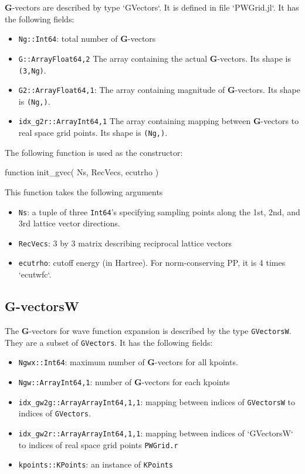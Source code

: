 \documentclass[a4paper,10pt]{paper}
\newcommand{\jlcode}[1]{\texttt{#1}}
\begin{document}
$\mathbf{G}$-vectors are described by type `GVectors`. It is defined in file `PWGrid.jl`.
It has the following fields:
\begin{itemize}
%
\item \jlcode{Ng::Int64}: total number of $\mathbf{G}$-vectors
%
\item \jlcode{G::Array{Float64,2}} The array containing the actual $\mathbf{G}$-vectors.
   Its shape is \jlcode{(3,Ng)}.
%
\item \jlcode{G2::Array{Float64,1}}: The array containing magnitude of $\mathbf{G}$-vectors.
  Its shape is \jlcode{(Ng,)}.
%
\item \jlcode{idx_g2r::Array{Int64,1}} The array containing mapping between $\mathbf{G}$-vectors
  to real space grid points. Its shape is \jlcode{(Ng,)}.
%
\end{itemize}

The following function is used as the constructor:

\begin{juliacode}
function init_gvec( Ns, RecVecs, ecutrho )
\end{juliacode}
%
This function takes the following arguments
%
\begin{itemize}
%
\item \jlcode{Ns}: a tuple of three \jlcode{Int64}'s specifying sampling points
  along the 1st, 2nd, and 3rd lattice vector directions.
%
\item \jlcode{RecVecs}: 3 by 3 matrix describing reciprocal lattice vectors
%
\item \jlcode{ecutrho}: cutoff energy (in Hartree). For norm-conserving PP,
  it is 4 times `ecutwfc`.
\end{itemize}


\subsection{G-vectorsW}

The $\mathbf{G}$-vectors for wave function expansion is described by
the type \jlcode{GVectorsW}.
They are a subset of \jlcode{GVectors}. It has the following fields:
\begin{itemize}
%
\item \jlcode{Ngwx::Int64}: maximum number of $\mathbf{G}$-vectors for all kpoints.
%
\item \jlcode{Ngw::Array{Int64,1}}: number of $\mathbf{G}$-vectors for each kpoints
%
\item \jlcode{idx_gw2g::Array{Array{Int64,1},1}}: mapping between indices of
  \jlcode{GVectorsW} to indices of \jlcode{GVectors}.
%
\item \jlcode{idx_gw2r::Array{Array{Int64,1},1}}: mapping between indices of `GVectorsW`
  to indices of real space grid points \jlcode{PWGrid.r}
%
\item \jlcode{kpoints::KPoints}: an instance of \jlcode{KPoints}
%
\end{itemize}
\end{document}
